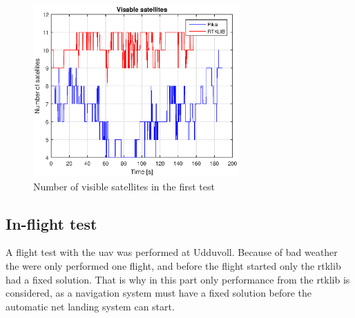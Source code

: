 \begin{figure}[H]
	\centering
		\includegraphics[width=0.7\textwidth]{figs/plots/numSatWalk2.eps}
		\caption{Number of visible satellites in the first test}
		\label{figure:numSatWalk2}
\end{figure}
\subsection{In-flight test}
A flight test with the \gls{uav} was performed at Udduvoll. Because of bad weather the were only performed one flight, and before the flight started only the \gls{rtklib} had a fixed solution. That is why in this part only performance from the \gls{rtklib} is considered, as a navigation system must have a fixed solution before the automatic net landing system can start.

